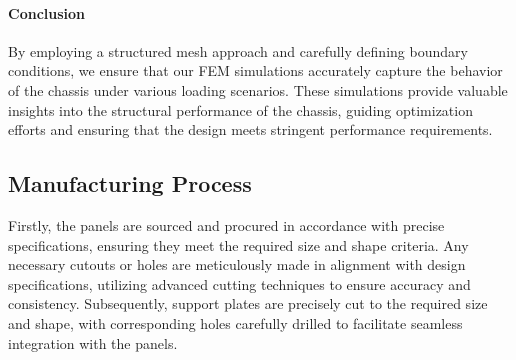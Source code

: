 \paragraph{Conclusion} By employing a structured mesh approach and carefully defining boundary conditions, we ensure that our FEM simulations accurately capture the behavior of the chassis under various loading scenarios. These simulations provide valuable insights into the structural performance of the chassis, guiding optimization efforts and ensuring that the design meets stringent performance requirements.

\subsection{Manufacturing Process}

Firstly, the panels are sourced and procured in accordance with precise specifications, ensuring they meet the required size and shape criteria. Any necessary cutouts or holes are meticulously made in alignment with design specifications, utilizing advanced cutting techniques to ensure accuracy and consistency. Subsequently, support plates are precisely cut to the required size and shape, with corresponding holes carefully drilled to facilitate seamless integration with the panels. 

